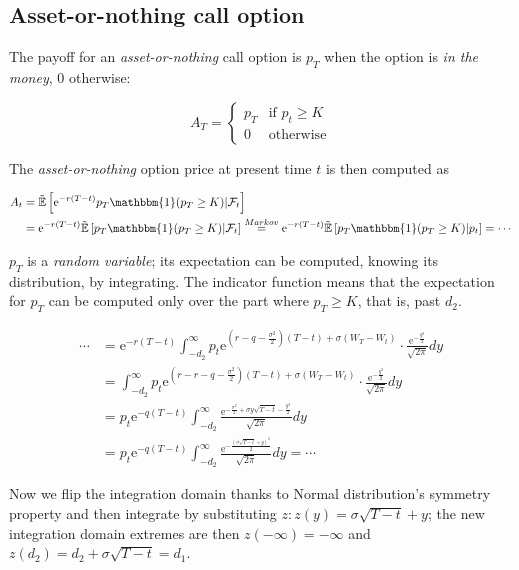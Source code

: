 \documentclass[oneside,titlepage,headinclude,12pt,a4paper,BCOR5mm,footinclude]{book}
\theoremstyle{defn}
\newcommand{\eexp}{\mathrm{e}}
\newcommand{\rnE}[1]{\mathbb{\tilde E}\left[ {#1} \right]}
\begin{document}
\subsection{Asset-or-nothing call option}

The payoff for an \textit{asset-or-nothing} call option is $p_T$ when the option
is \textit{in the money}, $0$ otherwise:

\[
  A_T = \left\{ \begin{array}{cl}
      p_T & \text{if } p_t \geq K \\
      0 & \text{otherwise}
    \end{array}
\]

The \textit{asset-or-nothing} option price at present time $t$ is then computed as

\begin{align*}
  A_t &= \rnE{ \eexp^{-r(T-t)} p_T \mathbbm{1}(p_T \geq K) | \mathcal{F}_t }
  \\&= \eexp^{-r(T-t)} \rnE{ p_T \mathbbm{1}(p_T \geq K) | \mathcal{F}_t }
       \stackrel{\small Markov}{=}
       \eexp^{-r(T-t)} \rnE{ p_T \mathbbm{1}(p_T \geq K) | p_t } = \cdots
\end{align*}

$p_T$ is  a \textit{random variable};  its expectation can be  computed, knowing
its  distribution,  by  integrating.  The  indicator  function  means  that  the
expectation for  $p_T$ can be  computed only over the  part where $p_T  \geq K$,
that is, past $d_2$.

\begin{align*}
  \cdots &= \eexp^{-r(T-t)} \int_{-d_2}^\infty p_t \eexp^{\left(r-q-\frac{\sigma^2}{2}\right)(T-t)+\sigma (W_T-W_t)} 
            \cdot \frac{\eexp^{-\frac{y^2}{2}}}{\sqrt{2\pi}} dy
  \\&= \int_{-d_2}^\infty p_t \eexp^{\left(r-r-q-\frac{\sigma^2}{2}\right)(T-t)+\sigma (W_T-W_t)} 
       \cdot \frac{\eexp^{-\frac{y^2}{2}}}{\sqrt{2\pi}} dy
   \\&= p_t \eexp^{-q(T-t)} \int_{-d_2}^\infty \frac{\eexp^{-\frac{\sigma^2}{2}+\sigma y\sqrt{T-t}-\frac{y^2}{2}}}{\sqrt{2\pi}} dy
   \\&= p_t \eexp^{-q(T-t)} \int_{-d_2}^\infty \frac{\eexp^{-\frac{(\sigma\sqrt{T-t} + y)^2}{2}}}{\sqrt{2\pi}} dy = \cdots
\end{align*}

Now  we flip  the integration  domain thanks  to Normal  distribution's symmetry
property and then  integrate by substituting $z : z(y)  = \sigma\sqrt{T-t} + y$;
the new integration domain extremes are  then $z(-\infty) = -\infty$ and $z(d_2)
= d_2 + \sigma\sqrt{T-t} = d_1$.
\end{document}
